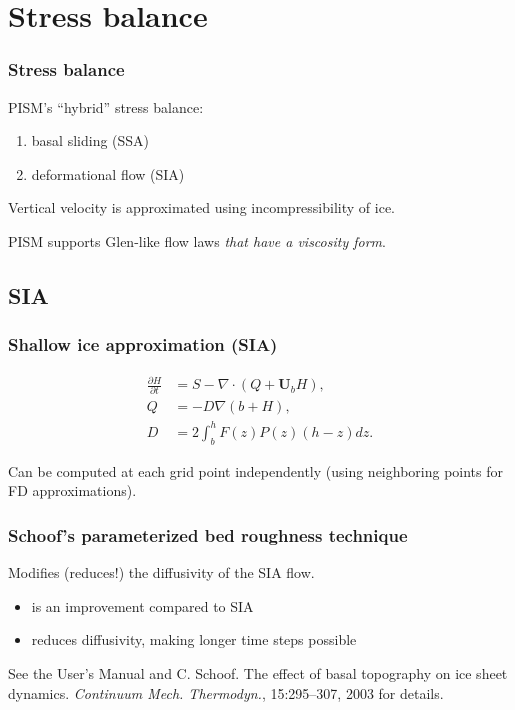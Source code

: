 \documentclass[hide notes,intlimits]{beamer}
\begin{document}
\section{Stress balance}
\label{sec:stress-balance}

\begin{frame}
  \frametitle{Stress balance}

  PISM's ``hybrid'' stress balance:
  \begin{enumerate}
  \item basal sliding (SSA)
  \item deformational flow (SIA)
  \end{enumerate}

  Vertical velocity is approximated using incompressibility of ice.

  PISM supports Glen-like flow laws \emph{that have a viscosity form}.

\end{frame}


\subsection{SIA}
\label{sec:sia}

\begin{frame}
  \frametitle{Shallow ice approximation (SIA)}

  \begin{align}
    \label{eq:2}
    \frac{\partial H}{\partial t} &= S - \nabla \cdot (Q + \mathbf{U}_b H),\\
    Q &= -D \nabla (b + H),\\
    D &= 2\int_b^h F(z)P(z)(h-z)dz.
  \end{align}

  Can be computed at each grid point independently (using neighboring
  points for FD approximations).

\end{frame}

\begin{frame}
  \frametitle{Schoof's parameterized bed roughness technique}

  Modifies (reduces!) the diffusivity of the SIA flow.

  \begin{itemize}
  \item is an improvement compared to SIA
  \item reduces diffusivity, making longer time steps possible
  \end{itemize}

  See the User's Manual and C. Schoof. The effect of basal topography
  on ice sheet dynamics. \emph{Continuum Mech. Thermodyn.},
  15:295–307, 2003 for details.
\end{frame}
\end{document}
